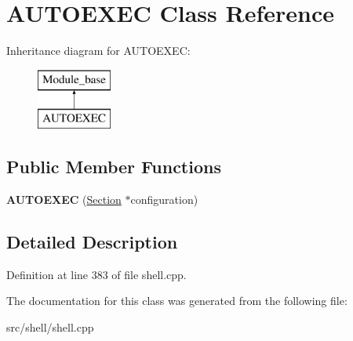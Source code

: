 \hypertarget{classAUTOEXEC}{\section{A\-U\-T\-O\-E\-X\-E\-C Class Reference}
\label{classAUTOEXEC}
}
Inheritance diagram for A\-U\-T\-O\-E\-X\-E\-C\-:\begin{figure}[H]
\begin{center}
\leavevmode
\includegraphics[height=2.000000cm]{classAUTOEXEC}
\end{center}
\end{figure}
\subsection*{Public Member Functions}
\begin{DoxyCompactItemize}
\item 
\hypertarget{classAUTOEXEC_a0c36ab7cc15d2e8ed2fc590cafc89672}{{\bfseries A\-U\-T\-O\-E\-X\-E\-C} (\hyperlink{classSection}{Section} $\ast$configuration)}\label{classAUTOEXEC_a0c36ab7cc15d2e8ed2fc590cafc89672}

\end{DoxyCompactItemize}


\subsection{Detailed Description}


Definition at line 383 of file shell.\-cpp.



The documentation for this class was generated from the following file\-:\begin{DoxyCompactItemize}
\item 
src/shell/shell.\-cpp\end{DoxyCompactItemize}

